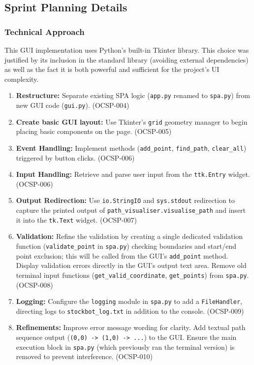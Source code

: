 \clearpage
\subsection{Sprint Planning Details}

\subsubsection{Technical Approach}

This GUI implementation uses Python's built-in Tkinter library. This choice was justified by its inclusion in the standard library (avoiding external dependencies) as well as the fact it is both powerful and sufficient for the project's UI complexity.

\begin{enumerate}
	\item \textbf{Restructure:} Separate existing SPA logic (\verb|app.py| renamed to \verb|spa.py|) from new GUI code (\verb|gui.py|). (OCSP-004)
	\item \textbf{Create basic GUI layout:} Use Tkinter's \verb|grid| geometry manager to begin placing basic components on the page. (OCSP-005)
	\item \textbf{Event Handling:} Implement methods (\verb|add_point|, \verb|find_path|, \verb|clear_all|) triggered by button clicks. (OCSP-006)
	\item \textbf{Input Handling:} Retrieve and parse user input from the \verb|ttk.Entry| widget. (OCSP-006)
	\item \textbf{Output Redirection:} Use \verb|io.StringIO| and \verb|sys.stdout| redirection to capture the printed output of \verb|path_visualiser.visualise_path| and insert it into the \verb|tk.Text| widget. (OCSP-007)
	\item \textbf{Validation:} Refine the validation by creating a single dedicated validation function (\verb|validate_point| in \verb|spa.py|) checking boundaries and start/end point exclusion; this will be called from the GUI's \verb|add_point| method. Display validation errors directly in the GUI's output text area. Remove old terminal input functions (\verb|get_valid_coordinate|, \verb|get_points|) from \verb|spa.py|. (OCSP-008)
	\item \textbf{Logging:} Configure the \verb|logging| module in \verb|spa.py| to add a \verb|FileHandler|, directing logs to \verb|stockbot_log.txt| in addition to the console. (OCSP-009)
	\item \textbf{Refinements:} Improve error message wording for clarity. Add textual path sequence output (\verb|(0,0) -> (1,0) -> ...|) to the GUI. Ensure the main execution block in \verb|spa.py| (which previously ran the terminal version) is removed to prevent interference. (OCSP-010)
\end{enumerate}

